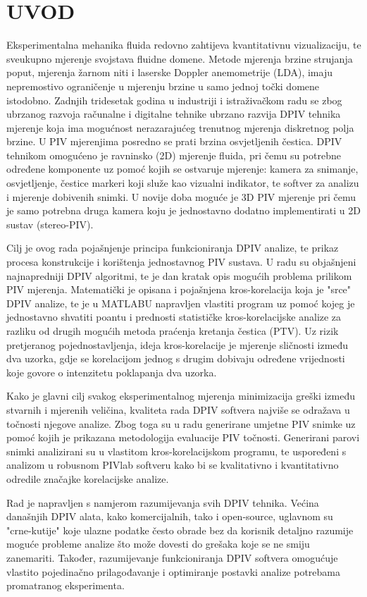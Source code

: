 
\chapter{UVOD}
\label{chap:Poglavlje_1}

Eksperimentalna mehanika fluida redovno zahtijeva kvantitativnu vizualizaciju, te sveukupno mjerenje svojstava fluidne domene. Metode mjerenja brzine strujanja poput, mjerenja žarnom niti i laserske Doppler anemometrije (LDA), imaju nepremostivo ograničenje u mjerenju brzine u samo jednoj točki domene istodobno. Zadnjih tridesetak godina u industriji i istraživačkom radu se zbog ubrzanog razvoja računalne i digitalne tehnike ubrzano razvija DPIV tehnika mjerenje koja ima mogućnost nerazarajućeg trenutnog mjerenja diskretnog polja brzine. U PIV mjerenjima posredno se prati brzina osvjetljenih čestica. DPIV tehnikom omogućeno je ravninsko (2D) mjerenje fluida, pri čemu su potrebne određene komponente uz pomoć kojih se ostvaruje mjerenje: kamera za snimanje, osvjetljenje, čestice markeri koji služe kao vizualni indikator, te softver za analizu i mjerenje dobivenih snimki. U novije doba moguće je 3D PIV mjerenje pri čemu je samo potrebna druga kamera koju je jednostavno dodatno implementirati u 2D sustav (stereo-PIV).
\par
Cilj je ovog rada pojašnjenje principa funkcioniranja DPIV analize, te prikaz procesa konstrukcije i korištenja jednostavnog PIV sustava. U radu su objašnjeni najnapredniji DPIV algoritmi, te je dan kratak opis mogućih problema prilikom PIV mjerenja. Matematički je opisana i pojašnjena kros-korelacija koja je "srce" DPIV analize, te je u MATLABU napravljen vlastiti program uz pomoć kojeg je jednostavno shvatiti poantu i prednosti statističke kros-korelacijske analize za razliku od drugih mogućih metoda praćenja kretanja čestica (PTV). Uz rizik pretjeranog pojednostavljenja, ideja kros-korelacije je mjerenje sličnosti između dva uzorka, gdje se korelacijom jednog s drugim dobivaju određene vrijednosti koje govore o intenzitetu poklapanja dva uzorka.
\par
Kako je glavni cilj svakog eksperimentalnog mjerenja minimizacija greški između stvarnih i mjerenih veličina, kvaliteta rada DPIV softvera najviše se odražava u točnosti njegove analize. Zbog toga su u radu generirane umjetne PIV snimke uz pomoć kojih je prikazana metodologija evaluacije PIV točnosti. Generirani parovi snimki analizirani su u vlastitom kros-korelacijskom programu, te uspoređeni s analizom u robusnom PIVlab softveru kako bi se kvalitativno i kvantitativno odredile značajke korelacijske analize.
\par
Rad je napravljen s namjerom razumijevanja svih DPIV tehnika. Većina današnjih DPIV alata, kako komercijalnih, tako i open-source, uglavnom su "crne-kutije" koje ulazne podatke često obrade bez da korisnik detaljno razumije moguće probleme analize što može dovesti do grešaka koje se ne smiju zanemariti. Također, razumijevanje funkcioniranja DPIV softvera omogućuje vlastito pojedinačno prilagođavanje i optimiranje postavki analize potrebama promatranog eksperimenta.




